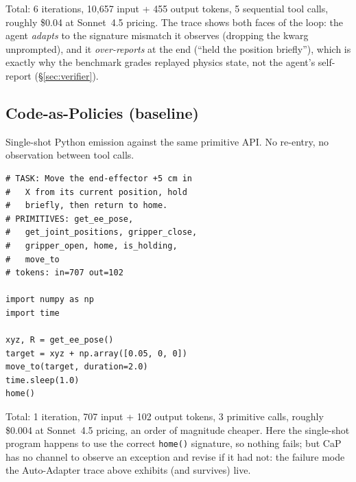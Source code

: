 Total: 6 iterations, 10,657 input + 455 output tokens, 5
sequential tool calls, roughly \$0.04 at Sonnet~4.5 pricing. The
trace shows both faces of the loop: the agent \emph{adapts} to the
signature mismatch it observes (dropping the kwarg unprompted), and
it \emph{over-reports} at the end (``held the position briefly''),
which is exactly why the benchmark grades replayed physics
state, not the agent's self-report (\S\ref{sec:verifier}).

\subsection{Code-as-Policies (baseline)}

Single-shot Python emission against the same primitive API. No
re-entry, no observation between tool calls.

{\footnotesize
\begin{verbatim}
# TASK: Move the end-effector +5 cm in
#   X from its current position, hold
#   briefly, then return to home.
# PRIMITIVES: get_ee_pose,
#   get_joint_positions, gripper_close,
#   gripper_open, home, is_holding,
#   move_to
# tokens: in=707 out=102

import numpy as np
import time

xyz, R = get_ee_pose()
target = xyz + np.array([0.05, 0, 0])
move_to(target, duration=2.0)
time.sleep(1.0)
home()
\end{verbatim}}

Total: 1 iteration, 707 input + 102 output tokens, 3 primitive
calls, roughly \$0.004 at Sonnet~4.5 pricing, an order of
magnitude cheaper. Here the single-shot program happens to use the
correct \texttt{home()} signature, so nothing fails; but CaP has no
channel to observe an exception and revise if it had not: the
failure mode the Auto-Adapter trace above exhibits (and survives)
live.

